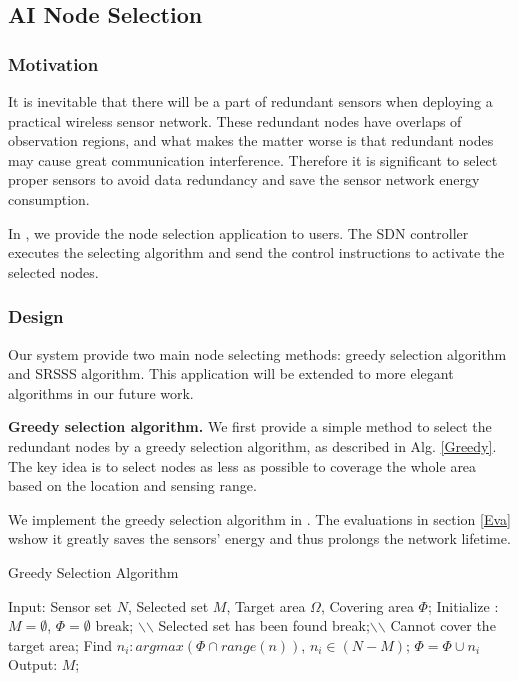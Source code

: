 \subsection{AI Node Selection}

\subsubsection{Motivation}

It is inevitable that there will be a part of redundant sensors when deploying a 
practical wireless sensor network. These redundant nodes have overlaps of
observation regions, and what makes the matter worse is that redundant nodes
may cause great communication interference. Therefore it is significant to select 
proper sensors to avoid data redundancy and save the sensor network energy consumption.

In {\sdn}, we provide the node selection application to users. The SDN controller executes the 
selecting algorithm and send the control instructions to activate the selected nodes.

\subsubsection{Design} Our {\sdn} system provide two main node selecting methods: 
greedy selection algorithm and SRSSS algorithm. This application will be extended to more elegant 
algorithms in our future work. 

\textbf{Greedy selection algorithm.} We first provide a simple method to select 
the redundant nodes by a greedy selection algorithm, as described in Alg. \ref{Greedy}. 
The key idea is to select nodes as less as possible to coverage the whole area
 based on the location and sensing range. 
 
We implement the greedy selection algorithm in {\sdn}. The evaluations in section \ref{Eva} 
wshow it greatly saves the sensors' energy and thus prolongs the network lifetime.

\begin{algorithm}
\caption{Greedy Selection Algorithm}
\label{Greedy}
\begin{algorithmic}[1]
\STATE Input: Sensor set $N$, Selected set $M$, Target area $\Omega$, Covering area $\Phi$;
\STATE Initialize : $M = \emptyset$, $\Phi = \emptyset$
    \IF{$\Phi = \Omega $}
        \STATE break; $\backslash$$\backslash$ Selected set has been found
    \ENDIF
    	 \STATE break;$\backslash$$\backslash$ Cannot cover the target area;
    \ENDIF
    \STATE Find $n_i : argmax(\Phi \cap range(n))$, $n_i \in (N-M)$;
    \STATE $\Phi = \Phi \cup {n_i}$
\ENDWHILE
\STATE Output: $M$;
\end{algorithmic}
\end{algorithm}


